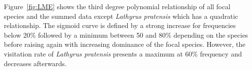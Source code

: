 Figure~\ref{fig:LME} shows the third degree polynomial relationship of all focal species and the summed data except \textit{Lathyrus pratensis} which has a quadratic relationship. The sigmoid curve is defined by a strong increase for frequencies below 20\% followed by a minimum between 50 and 80\% depending on the species before raising again with increasing dominance of the focal species. However, the visitation rate of \textit{Lathyrus pratensis} presents a maximum at 60\% frequency and decreases afterwards. 


%
%
%
